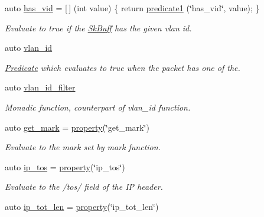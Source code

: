 \begin{DoxyCompactItemize}
auto \hyperlink{namespacepfq_1_1lang_1_1anonymous__namespace_02default_8hpp_03_a99c204d8095fdccd50d4cb24d32e5b5b}{has\+\_\+vid} = \mbox{[}$\,$\mbox{]} (int value) \{ return \hyperlink{namespacepfq_1_1lang_a3e018f096545ca95a68e67027c8e3144}{predicate1} (\char`\"{}has\+\_\+vid\char`\"{}, value); \}
\begin{DoxyCompactList}\small\item\em Evaluate to {\ttfamily true} if the \hyperlink{structpfq_1_1lang_1_1SkBuff}{Sk\+Buff} has the given vlan id. \end{DoxyCompactList}\item 
auto \hyperlink{namespacepfq_1_1lang_1_1anonymous__namespace_02default_8hpp_03_ad2a631020f34bf10335ebb0e79f03920}{vlan\+\_\+id}
\begin{DoxyCompactList}\small\item\em \hyperlink{structpfq_1_1lang_1_1Predicate}{Predicate} which evaluates to {\ttfamily true} when the packet has one of the. \end{DoxyCompactList}\item 
auto \hyperlink{namespacepfq_1_1lang_1_1anonymous__namespace_02default_8hpp_03_ab843ad210e98a7c8a4218efaf60f8c01}{vlan\+\_\+id\+\_\+filter}
\begin{DoxyCompactList}\small\item\em Monadic function, counterpart of {\ttfamily vlan\+\_\+id} function. \end{DoxyCompactList}\item 
auto \hyperlink{namespacepfq_1_1lang_1_1anonymous__namespace_02default_8hpp_03_ab733e24b3ca86450bea0b0888a6327d2}{get\+\_\+mark} = \hyperlink{namespacepfq_1_1lang_a3f461785d825c3f5e024dd65c18ea3dc}{property}(\char`\"{}get\+\_\+mark\char`\"{})
\begin{DoxyCompactList}\small\item\em Evaluate to the mark set by {\ttfamily mark} function. \end{DoxyCompactList}\item 
auto \hyperlink{namespacepfq_1_1lang_1_1anonymous__namespace_02default_8hpp_03_acc5d2b786c39d4177ab37ee16ee2295d}{ip\+\_\+tos} = \hyperlink{namespacepfq_1_1lang_a3f461785d825c3f5e024dd65c18ea3dc}{property}(\char`\"{}ip\+\_\+tos\char`\"{})
\begin{DoxyCompactList}\small\item\em Evaluate to the /tos/ field of the I\+P header. \end{DoxyCompactList}\item 
auto \hyperlink{namespacepfq_1_1lang_1_1anonymous__namespace_02default_8hpp_03_a48d42ce1bea31f55be3377e8f2c41bbe}{ip\+\_\+tot\+\_\+len} = \hyperlink{namespacepfq_1_1lang_a3f461785d825c3f5e024dd65c18ea3dc}{property}(\char`\"{}ip\+\_\+tot\+\_\+len\char`\"{})

\end{DoxyCompactItemize}
